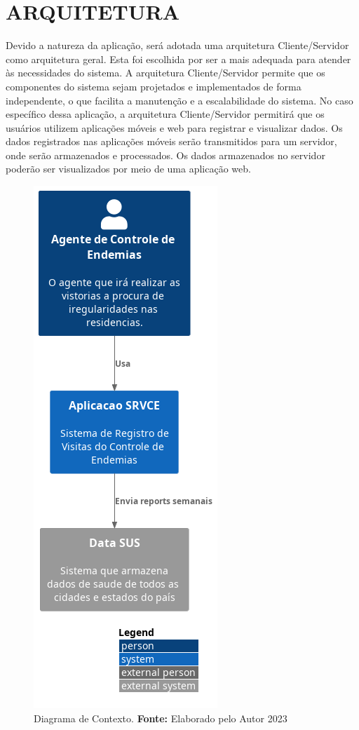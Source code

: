 \section{ARQUITETURA}

Devido a natureza da aplicação, será adotada uma arquitetura Cliente/Servidor como arquitetura geral. Esta foi escolhida por ser a mais adequada para atender às necessidades do sistema. 
A arquitetura Cliente/Servidor permite que os componentes do sistema sejam projetados e implementados de forma independente, o que facilita a manutenção e a escalabilidade do sistema.
No caso específico dessa aplicação, a arquitetura Cliente/Servidor permitirá que os usuários utilizem aplicações móveis e web para registrar e visualizar dados. Os dados registrados nas aplicações móveis serão transmitidos para um servidor, onde serão armazenados e processados. Os dados armazenados no servidor poderão ser visualizados por meio de uma aplicação web.

\begin{figure}[!htb]
	\centering
	\includegraphics[height=0.5\textheight]{dados/figuras/context_map.png}
	\caption{Diagrama de Contexto. \textbf{Fonte:} Elaborado pelo Autor 2023}
\end{figure}


